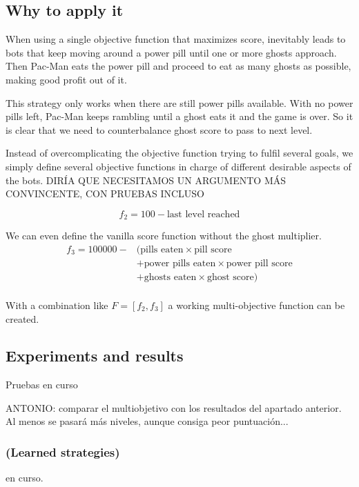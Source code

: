 \documentclass{llncs}
\newcommand{\paco}{Pac-Man }
\begin{document}
\subsection{Why to apply it}
When using a single objective function that maximizes score, inevitably leads to bots that keep moving around a power pill until one or more ghosts approach. Then \paco eats the power pill and proceed to eat as many ghosts as possible, making good profit out of it.

This strategy only works when there are still power pills available. With no power pills left, \paco keeps rambling until a ghost eats it and the game is over. So it is clear that we need to counterbalance ghost score to pass to next level.

Instead of overcomplicating the objective function trying to fulfil several goals, we simply define several objective functions in charge of different desirable aspects of the bots.
{\color{red} DIRÍA QUE NECESITAMOS UN ARGUMENTO MÁS CONVINCENTE, CON PRUEBAS INCLUSO}

\begin{equation}
f_2 = 100 - \text{last level reached}
\end{equation}

We can even define the vanilla score function without the ghost multiplier.
\begin{equation}
\begin{split}
f_3 = 100000 - & (\text{pills eaten} \times \text{pill score} \\
& + \text{power pills eaten} \times \text{power pill score} \\
& + \text{ghosts eaten} \times \text{ghost score}) \\
\end{split}
\end{equation}

With a combination like $F = [f_2, f_3]$ a working multi-objective function can be created.

\subsection{Experiments and results}
{\color{red} Pruebas en curso}

{\color{red}ANTONIO: comparar el multiobjetivo con los resultados del apartado anterior. Al menos se pasará más niveles, aunque consiga peor puntuación...}

\subsubsection{(Learned strategies)}
{\color{red} en curso.}
\end{document}
